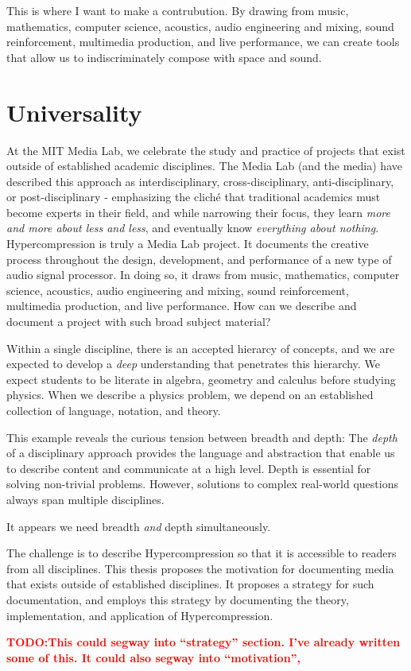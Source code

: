 \documentclass{tufte-book}
\newcommand{\TODO}[1]{\textcolor{red}{\bf TODO:#1}\xspace}
\newcommand{\thesis}{Hypercompression\xspace}
\begin{document}
This is where I want to make a contrubution. By drawing from music,
mathematics, computer science, acoustics, audio engineering and
mixing, sound reinforcement, multimedia production, and live
performance, we can create tools that allow us to indiscriminately
compose with space and sound.

\section{Universality}
\label{sec:universality}

At the MIT Media Lab, we celebrate the study and practice of projects
that exist outside of established academic disciplines. The Media Lab
(and the media) have described this approach as interdisciplinary,
cross-disciplinary, anti-disciplinary, or post-disciplinary -
emphasizing the clich\'{e} that traditional academics must become
experts in their field, and while narrowing their focus, they learn
\textit{more and more about less and less}, and eventually know
\textit{everything about nothing}.  \thesis is truly a Media Lab
project. It documents the creative process throughout the design,
development, and performance of a new type of audio signal
processor. In doing so, it draws from music, mathematics, computer
science, acoustics, audio engineering and mixing, sound reinforcement,
multimedia production, and live performance. How can we describe and
document a project with such broad subject material?  

Within a single
discipline, there is an accepted hierarcy of concepts, and we are
expected to develop a \emph{deep} understanding that penetrates this
hierarchy. We expect students to be literate in algebra, geometry and
calculus before studying physics. When we describe a physics problem,
we depend on an established collection of language, notation, and
theory.

This example reveals the curious tension between breadth and
depth: The \textit{depth} of a disciplinary approach provides the
language and abstraction that enable us to describe content and
communicate at a high level. Depth is essential for solving
non-trivial problems. However, solutions to complex real-world
questions always span multiple disciplines.


It appears we need breadth \emph{and} depth simultaneously. 

The challenge is to describe \thesis so that it is accessible to
readers from all disciplines. This thesis proposes the motivation for
documenting media that exists outside of established disciplines. It
proposes a strategy for such documentation, and employs this strategy
by documenting the theory, implementation, and application of \thesis.


\TODO{This could segway into ``strategy'' section. I've already
  written some of this. It could also segway into ``motivation'', }


\backmatter





\end{document}
